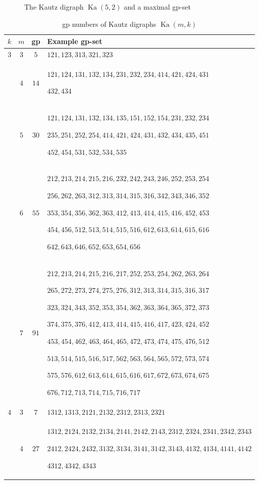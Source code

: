 \documentclass[a4paper,12pt]{article}
\theoremstyle{definition}
\DeclareMathOperator{\Ka}{Ka}
\begin{document}
\begin{figure}
		\caption{The Kautz digraph $\Ka(5,2)$ and a maximal gp-set}
		\label{fig:Ka52}
	\end{figure}
	
	\begin{table}
		\centering
		\begin{tabular}{|cccp{12cm}|}
			\hline
			$k$ & $m$ & gp & Example gp-set \\
			\hline
			$3$ & $3$ & $5$ &$121, 123, 313, 321, 323$ \\
			& $4$ & $14$ & $121, 124, 131, 132, 134, 231, 232, 234, 414, 421, 424, 431$\par
			$432, 434$ \\
			& $5$ & $30$ & $121, 124, 131, 132, 134, 135, 151, 152, 154, 231, 232, 234$\par
			$235, 251, 252, 254, 414, 421, 424, 431, 432, 434, 435, 451$\par
			$452, 454, 531, 532, 534, 535$ \\
			& $6$ & $55$ & $212, 213, 214, 215, 216, 232, 242, 243, 246, 252, 253, 254$\par
			$256, 262, 263, 312, 313, 314, 315, 316, 342, 343, 346, 352$\par
			$353, 354, 356, 362, 363, 412, 413, 414, 415, 416, 452, 453$\par
			$454, 456, 512, 513, 514, 515, 516, 612, 613, 614, 615, 616$\par
			$642, 643, 646, 652, 653, 654, 656$ \\
			& $7$ & $91$ & $212, 213, 214, 215, 216, 217, 252, 253, 254, 262, 263, 264$\par
			$265, 272, 273, 274, 275, 276, 312, 313, 314, 315, 316, 317$\par
			$323, 324, 343, 352, 353, 354, 362, 363, 364, 365, 372, 373$\par
			$374, 375, 376, 412, 413, 414, 415, 416, 417, 423, 424, 452$\par
			$453, 454, 462, 463, 464, 465, 472, 473, 474, 475, 476, 512$\par
			$513, 514, 515, 516, 517, 562, 563, 564, 565, 572, 573, 574$\par
			$575, 576, 612, 613, 614, 615, 616, 617, 672, 673, 674, 675$\par
			$676, 712, 713, 714, 715, 716, 717$ \\
			\hline
			$4$ & $3$ & $7$ & $1312, 1313, 2121, 2132, 2312, 2313, 2321$ \\
			& $4$ & $27$ & $1312, 2124, 2132, 2134, 2141, 2142, 2143, 2312, 2324, 2341, 2342, 2343$\par
			$2412, 2424, 2432, 3132, 3134, 3141, 3142, 3143, 4132, 4134, 4141, 4142$\par
			$4312, 4342, 4343$ \\
			\hline
		\end{tabular}
		\caption{gp numbers of Kautz digraphs $\Ka(m,k)$}
		\label{tab:kautz}
	\end{table}
	
\end{document}
